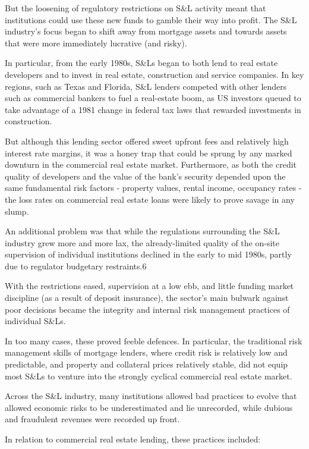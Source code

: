 But the loosening of regulatory restrictions on S&L activity meant that institutions could use these new funds to gamble their way into profit. The S&L industry's focus began to shift away from mortgage assets and towards assets that were more immediately lucrative (and risky).

In particular, from the early 1980s, S&Ls began to both lend to real estate developers and to invest in real estate, construction and service companies. In key regions, such as Texas and Florida, S&L lenders competed with other lenders such as commercial bankers to fuel a real-estate boom, as US investors queued to take advantage of a 1981 change in federal tax laws that rewarded investments in construction.

But although this lending sector offered sweet upfront fees and relatively high interest rate margins, it was a honey trap that could be sprung by any marked downturn in the commercial real estate market. Furthermore, as both the credit quality of developers and the value of the bank's security depended upon the same fundamental risk factors - property values, rental income, occupancy rates - the loss rates on commercial real estate loans were likely to prove savage in any slump.

An additional problem was that while the regulations surrounding the S&L industry grew more and more lax, the already-limited quality of the on-site supervision of individual institutions declined in the early to mid 1980s, partly due to regulator budgetary restraints.6

With the restrictions eased, supervision at a low ebb, and little funding market discipline (as a result of deposit insurance), the sector's main bulwark against poor decisions became the integrity and internal risk management practices of individual S&Ls.

In too many cases, these proved feeble defences. In particular, the traditional risk management skills of mortgage lenders, where credit risk is relatively low and predictable, and property and collateral prices relatively stable, did not equip most S&Ls to venture into the strongly cyclical commercial real estate market.

Across the S&L industry, many institutions allowed bad practices to evolve that allowed economic risks to be underestimated and lie unrecorded, while dubious and fraudulent revenues were recorded up front.

In relation to commercial real estate lending, these practices included:

